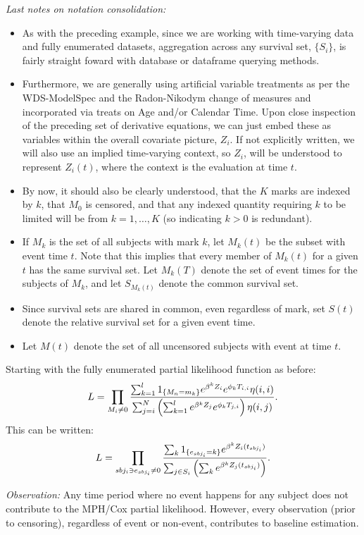 \documentclass[10pt]{article}
\begin{document}
{\em Last notes on notation consolidation:} 
\begin{itemize}
    \item As with the preceding example, since we are working with time-varying data and fully enumerated datasets, aggregation across any survival
set, $\{S_i\}$, is fairly straight foward with database or dataframe querying methods.
\item Furthermore, we are generally using artificial variable treatments as per the WDS-ModelSpec and the Radon-Nikodym change of measures 
and incorporated via treats on Age and/or Calendar Time.  Upon close inspection of the preceding set of derivative equations, we can just
embed these as variables within the overall covariate picture, $Z_i$.  If not explicitly written, we will also use an implied time-varying
context, so $Z_i$, will be understood to represent $Z_i(t)$, where the context is the evaluation at time $t$.  
     \item By now, it should 
also be clearly understood, that the $K$ marks are indexed by $k$, that $M_0$ is censored, and that any indexed quantity requiring $k$ to be 
limited will be from $k=1, \ldots, K$ (so indicating $k>0$ is redundant).
    \item If $M_k$ is the set of all subjects with mark $k$, let $M_k(t)$ be the subset with event time $t$.  Note that this implies that 
        every member of $M_k(t)$ for a given $t$ has the same survival set.  Let $M_k(T)$ denote the set of event times for the subjects of
        $M_k$,
        and let $S_{M_k(t)}$ denote the common survival set.
    \item Since survival sets are shared in common, even regardless of mark, set $S(t)$ denote the relative survival set for a given event
        time.
    \item Let $M(t)$ denote the set of all uncensored subjects with event at time $t$.
\end{itemize}

Starting with the fully enumerated partial likelihood function as before:
$$L=\prod_{M_i \not = 0} {{  \sum_{k=1}^l1_{\{M_n=m_k\}}e^{\beta^kZ_i}e^{\phi_kT_{i,i}}\eta(i,i) }
\over { \sum_{j=i}^N \left({ \sum_{k=1}^le^{\beta^kZ_j}e^{\phi_kT_{j,i}} }\right)\eta(i,j) } }. $$
This can be written:
$$L=\prod_{sbj_i \ni e_{sbj_i} \ne 0}  { { \sum_k 1_{\{e_{sbj_i}=k\}}e^{\beta^kZ_i(t_{sbj_i})} }
\over { \sum_{j \in S_i} \left({ \sum_k e^{\beta^kZ_j(t_{sbj_i})} }\right) } }. $$

{\em Observation:} Any time period where no event happens for any subject does not contribute to the MPH/Cox partial likelihood.  However,
every observation (prior to censoring), regardless of event or non-event, contributes to baseline estimation.
\end{document}
